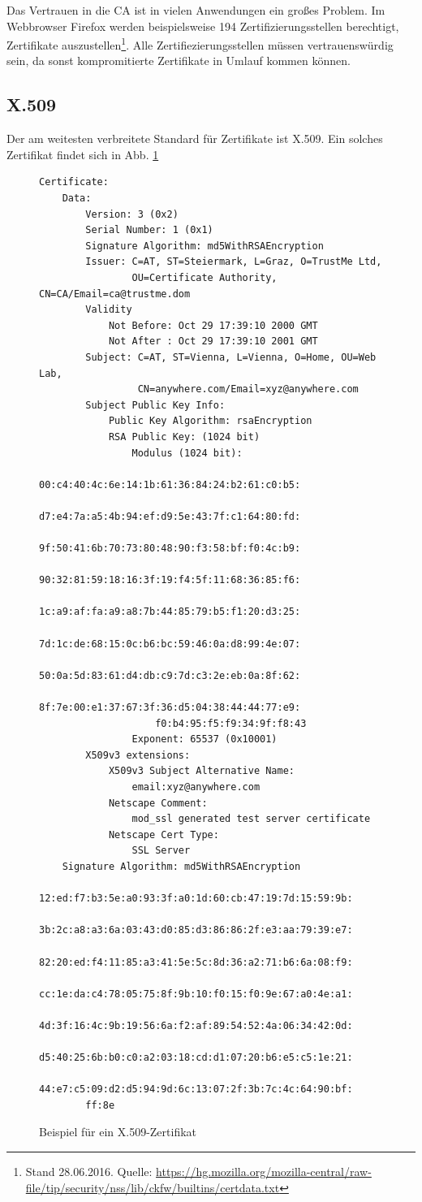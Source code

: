 Das Vertrauen in die CA ist in vielen Anwendungen ein großes Problem. Im
Webbrowser Firefox werden beispielsweise 194 Zertifizierungsstellen
berechtigt, Zertifikate auszustellen\footnote{Stand 28.06.2016. Quelle:
  \url{https://hg.mozilla.org/mozilla-central/raw-file/tip/security/nss/lib/ckfw/builtins/certdata.txt}}. Alle
Zertifiezierungsstellen müssen vertrauenswürdig sein, da sonst
kompromitierte Zertifikate in Umlauf kommen können.

\subsection{X.509}
Der am weitesten verbreitete Standard für Zertifikate ist X.509. Ein
solches Zertifikat findet sich in Abb. \ref{fig:x509}
\begin{figure}
\begin{lstlisting}
Certificate:
    Data:
        Version: 3 (0x2)
        Serial Number: 1 (0x1)
        Signature Algorithm: md5WithRSAEncryption
        Issuer: C=AT, ST=Steiermark, L=Graz, O=TrustMe Ltd,
                OU=Certificate Authority, CN=CA/Email=ca@trustme.dom 
        Validity
            Not Before: Oct 29 17:39:10 2000 GMT
            Not After : Oct 29 17:39:10 2001 GMT
        Subject: C=AT, ST=Vienna, L=Vienna, O=Home, OU=Web Lab,
                 CN=anywhere.com/Email=xyz@anywhere.com 
        Subject Public Key Info:
            Public Key Algorithm: rsaEncryption
            RSA Public Key: (1024 bit)
                Modulus (1024 bit):
                    00:c4:40:4c:6e:14:1b:61:36:84:24:b2:61:c0:b5:
                    d7:e4:7a:a5:4b:94:ef:d9:5e:43:7f:c1:64:80:fd:
                    9f:50:41:6b:70:73:80:48:90:f3:58:bf:f0:4c:b9:
                    90:32:81:59:18:16:3f:19:f4:5f:11:68:36:85:f6:
                    1c:a9:af:fa:a9:a8:7b:44:85:79:b5:f1:20:d3:25:
                    7d:1c:de:68:15:0c:b6:bc:59:46:0a:d8:99:4e:07:
                    50:0a:5d:83:61:d4:db:c9:7d:c3:2e:eb:0a:8f:62:
                    8f:7e:00:e1:37:67:3f:36:d5:04:38:44:44:77:e9:
                    f0:b4:95:f5:f9:34:9f:f8:43
                Exponent: 65537 (0x10001)
        X509v3 extensions:
            X509v3 Subject Alternative Name:
                email:xyz@anywhere.com
            Netscape Comment:
                mod_ssl generated test server certificate
            Netscape Cert Type:
                SSL Server
    Signature Algorithm: md5WithRSAEncryption
        12:ed:f7:b3:5e:a0:93:3f:a0:1d:60:cb:47:19:7d:15:59:9b:
        3b:2c:a8:a3:6a:03:43:d0:85:d3:86:86:2f:e3:aa:79:39:e7:
        82:20:ed:f4:11:85:a3:41:5e:5c:8d:36:a2:71:b6:6a:08:f9:
        cc:1e:da:c4:78:05:75:8f:9b:10:f0:15:f0:9e:67:a0:4e:a1:
        4d:3f:16:4c:9b:19:56:6a:f2:af:89:54:52:4a:06:34:42:0d:
        d5:40:25:6b:b0:c0:a2:03:18:cd:d1:07:20:b6:e5:c5:1e:21:
        44:e7:c5:09:d2:d5:94:9d:6c:13:07:2f:3b:7c:4c:64:90:bf:
        ff:8e
\end{lstlisting}
\caption{Beispiel für ein X.509-Zertifikat}
\label{fig:x509}
\end{figure}


